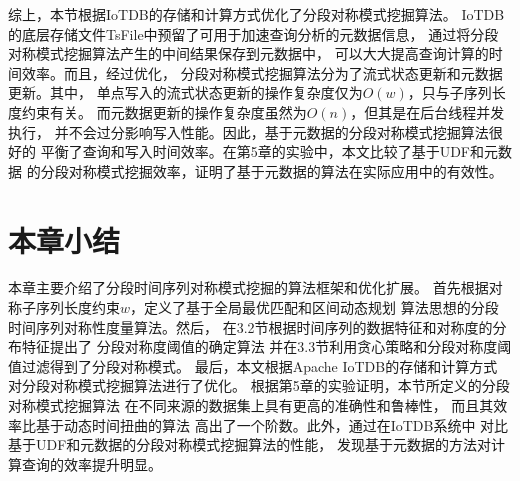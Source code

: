 综上，本节根据IoTDB的存储和计算方式优化了分段对称模式挖掘算法。
IoTDB的底层存储文件TsFile中预留了可用于加速查询分析的元数据信息，
通过将分段对称模式挖掘算法产生的中间结果保存到元数据中，
可以大大提高查询计算的时间效率。而且，经过优化，
分段对称模式挖掘算法分为了流式状态更新和元数据更新。其中，
单点写入的流式状态更新的操作复杂度仅为$O(w)$，只与子序列长度约束有关。
而元数据更新的操作复杂度虽然为$O(n)$，但其是在后台线程并发执行，
并不会过分影响写入性能。因此，基于元数据的分段对称模式挖掘算法很好的
平衡了查询和写入时间效率。在第5章的实验中，本文比较了基于UDF和元数据
的分段对称模式挖掘效率，证明了基于元数据的算法在实际应用中的有效性。


\section{本章小结}
本章主要介绍了分段时间序列对称模式挖掘的算法框架和优化扩展。
首先根据对称子序列长度约束$w$，定义了基于全局最优匹配和区间动态规划
算法思想的分段时间序列对称性度量算法。然后，
在3.2节根据时间序列的数据特征和对称度的分布特征提出了
分段对称度阈值的确定算法
并在3.3节利用贪心策略和分段对称度阈值过滤得到了分段对称模式。
最后，本文根据Apache IoTDB的存储和计算方式
对分段对称模式挖掘算法进行了优化。
根据第5章的实验证明，本节所定义的分段对称模式挖掘算法
在不同来源的数据集上具有更高的准确性和鲁棒性，
而且其效率比基于动态时间扭曲的算法
高出了一个阶数。此外，通过在IoTDB系统中
对比基于UDF和元数据的分段对称模式挖掘算法的性能，
发现基于元数据的方法对计算查询的效率提升明显。






